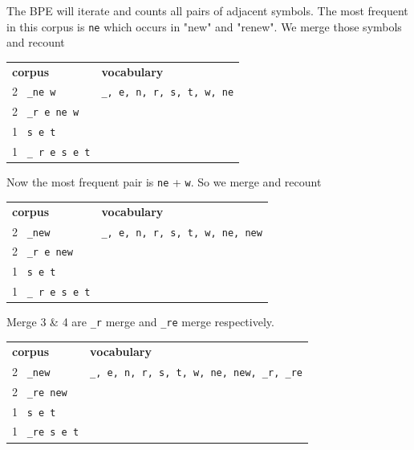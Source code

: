 \documentclass[11pt]{article}
\begin{document}
The BPE will iterate and counts all pairs of adjacent symbols. The most frequent
in this corpus is \texttt{ne} which occurs in "new" and "renew". We merge those
symbols and recount

\begin{center}
	\begin{tabular}{ll}
		\textbf{corpus}         & \textbf{vocabulary}               \\
		2 \ \texttt{\_ne w}     & \texttt{\_, e, n, r, s, t, w, ne} \\
		2 \ \texttt{\_r e ne w} &                                   \\
		1 \ \texttt{s e t}      &                                   \\
		1 \ \texttt{\_ r e s e t}
	\end{tabular}
\end{center}

Now the most frequent pair is \texttt{ne} + \texttt{w}. So we merge and recount

\begin{center}
	\begin{tabular}{ll}
		\textbf{corpus}        & \textbf{vocabulary}                    \\
		2 \ \texttt{\_new}     & \texttt{\_, e, n, r, s, t, w, ne, new} \\
		2 \ \texttt{\_r e new} &                                        \\
		1 \ \texttt{s e t}     &                                        \\
		1 \ \texttt{\_ r e s e t}
	\end{tabular}
\end{center}

Merge 3 \& 4 are \texttt{\_r} merge and \texttt{\_re} merge respectively.

\begin{center}
	\begin{tabular}{ll}
		\textbf{corpus}       & \textbf{vocabulary}                               \\
		2 \ \texttt{\_new}    & \texttt{\_, e, n, r, s, t, w, ne, new, \_r, \_re} \\
		2 \ \texttt{\_re new} &                                                   \\
		1 \ \texttt{s e t}    &                                                   \\
		1 \ \texttt{\_re s e t}
	\end{tabular}
\end{center}
\end{document}
